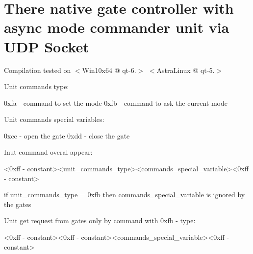 \chapter{There native gate controller with async mode commander unit via UDP Socket}
\hypertarget{index}{}\label{index}
\label{index_md_readme}%
%


Compilation tested on \texorpdfstring{$<$}{<}Win10x64 @ qt-\/6.\texorpdfstring{$>$}{>} \texorpdfstring{$<$}{<}Astra\+Linux @ qt-\/5.\texorpdfstring{$>$}{>}

Unit commands type\+: \begin{DoxyVerb}0xfa - command to set the mode
0xfb - command to ask the current mode
\end{DoxyVerb}


Unit commands special variables\+: \begin{DoxyVerb}0xcc - open the gate
0xdd - close the gate
\end{DoxyVerb}


Inut command overal appear\+: \begin{DoxyVerb}<0xff - constant><unit_commands_type><commands_special_variable><0xff - constant>
\end{DoxyVerb}
 if unit\+\_\+commands\+\_\+type = 0xfb then commands\+\_\+special\+\_\+variable is ignored by the gates

Unit get request from gates only by command with 0xfb -\/ type\+: \begin{DoxyVerb}<0xff - constant><0xff - constant><commands_special_variable><0xff - constant>
\end{DoxyVerb}
 